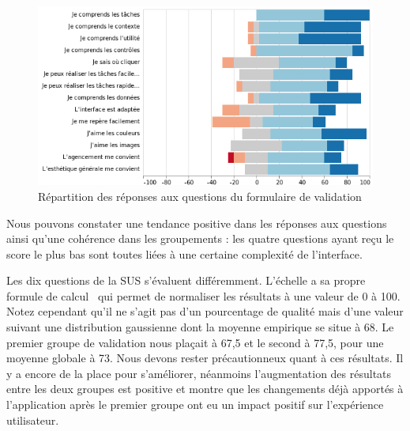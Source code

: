\documentclass{EPL-master-thesis-covers-FR}
\begin{document}
				\begin{figure}[H]
					\includegraphics[width=\textwidth]{images/likert_questions}
					\caption{Répartition des réponses aux questions du formulaire de validation}
					\label{fig:validation_likert}
				\end{figure}

				Nous pouvons constater une tendance positive dans les réponses aux questions ainsi qu'une cohérence dans les groupements : les quatre questions ayant reçu le score le plus bas sont toutes liées à une certaine complexité de l'interface.

				Les dix questions de la SUS s'évaluent différemment. L'échelle a sa propre formule de calcul~\cite{ref:sus} qui permet de normaliser les résultats à une valeur de 0 à 100. Notez cependant qu'il ne s'agit pas d'un pourcentage de qualité mais d'une valeur suivant une distribution gaussienne dont la moyenne empirique se situe à 68. Le premier groupe de validation nous plaçait à 67,5 et le second à 77,5, pour une moyenne globale à 73. Nous devons rester précautionneux quant à ces résultats. Il y a encore de la place pour s'améliorer, néanmoins l'augmentation des résultats entre les deux groupes est positive et montre que les changements déjà apportés à l'application après le premier groupe ont eu un impact positif sur l'expérience utilisateur.
\end{document}
